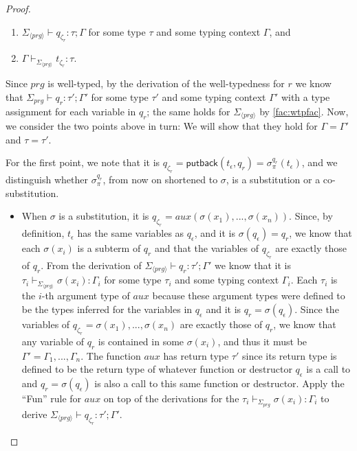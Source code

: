 \begin{lemma}
\begin{proof}
%

\begin{enumerate}
\item $\Sigma_{\langle prg \rangle} \vdash q_{\zeta_r} : \tau; \Gamma$ for some type $\tau$ and some typing context $\Gamma$, and

\item $\Gamma \vdash_{\Sigma_{\langle prg \rangle}} t_{\zeta_r} : \tau$.
\end{enumerate}
Since $prg$ is well-typed, by the derivation of the well-typedness for $r$ we know that $\Sigma_{prg} \vdash q_r : \tau'; \Gamma'$ for some type $\tau'$ and some typing context $\Gamma'$ with a type assignment for each variable in $q_r$; the same holds for $\Sigma_{\langle prg \rangle}$ by \autoref{fac:wtpfac}. Now, we consider the two points above in turn: We will show that they hold for $\Gamma = \Gamma'$ and $\tau = \tau'$.

For the first point, we note that it is $q_{\zeta_r} = \textsf{putback}(t_\epsilon, q_r) = \sigma^{q_r}_\pi(t_\epsilon)$, and we distinguish whether $\sigma^{q_r}_\pi$, from now on shortened to $\sigma$, is a substitution or a co-substitution.
\begin{itemize}
\item When $\sigma$ is a substitution, it is $q_{\zeta_r} = aux(\sigma(x_1), ..., \sigma(x_n))$. Since, by definition, $t_\epsilon$ has the same variables as $q_\epsilon$, and it is $\sigma(q_\epsilon) = q_r$, we know that each $\sigma(x_i)$ is a subterm of $q_r$ and that the variables of $q_{\zeta_r}$ are exactly those of $q_r$. From the derivation of $\Sigma_{\langle prg \rangle} \vdash q_r : \tau'; \Gamma'$ we know that it is $\tau_i \vdash_{\Sigma_{\langle prg \rangle}} \sigma(x_i) : \Gamma_i$ for some type $\tau_i$ and some typing context $\Gamma_i$. Each $\tau_i$ is the $i$-th argument type of $aux$ because these argument types were defined to be the types inferred for the variables in $q_\epsilon$ and it is $q_r = \sigma(q_\epsilon)$. Since the variables of $q_{\zeta_r} = \sigma(x_1), ..., \sigma(x_n)$ are exactly those of $q_r$, we know that any variable of $q_r$ is contained in some $\sigma(x_i)$, and thus it must be $\Gamma' = \Gamma_1, ..., \Gamma_n$. The function $aux$ has return type $\tau'$ since its return type is defined to be the return type of whatever function or destructor $q_\epsilon$ is a call to and $q_r = \sigma(q_\epsilon)$ is also a call to this same function or destructor. Apply the ``Fun'' rule for $aux$ on top of the derivations for the $\tau_i \vdash_{\Sigma_{prg}} \sigma(x_i) : \Gamma_i$ to derive $\Sigma_{\langle prg \rangle} \vdash q_{\zeta_r} : \tau'; \Gamma'$.


\end{itemize}
\end{proof}
\end{lemma}
